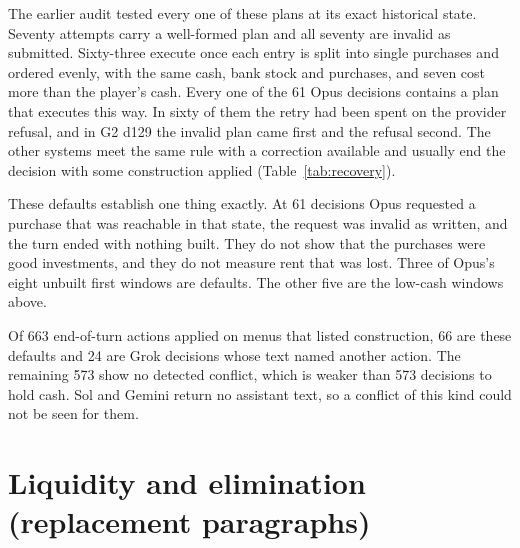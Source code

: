 The earlier audit tested every one of these plans at its exact historical state. Seventy attempts carry a well-formed plan and all seventy are invalid as submitted. Sixty-three execute once each entry is split into single purchases and ordered evenly, with the same cash, bank stock and purchases, and seven cost more than the player's cash. Every one of the 61 Opus decisions contains a plan that executes this way. In sixty of them the retry had been spent on the provider refusal, and in G2 d129 the invalid plan came first and the refusal second. The other systems meet the same rule with a correction available and usually end the decision with some construction applied (Table~\ref{tab:recovery}).

These defaults establish one thing exactly. At 61 decisions Opus requested a purchase that was reachable in that state, the request was invalid as written, and the turn ended with nothing built. They do not show that the purchases were good investments, and they do not measure rent that was lost. Three of Opus's eight unbuilt first windows are defaults. The other five are the low-cash windows above.

Of 663 end-of-turn actions applied on menus that listed construction, 66 are these defaults and 24 are Grok decisions whose text named another action. The remaining 573 show no detected conflict, which is weaker than 573 decisions to hold cash. Sol and Gemini return no assistant text, so a conflict of this kind could not be seen for them.

\section{Liquidity and elimination (replacement paragraphs)}
\label{sec:liquidity}

